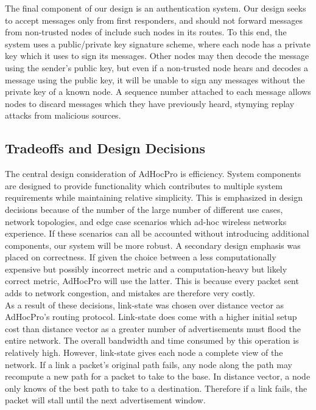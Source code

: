 \documentclass[letterpaper]{article}
\begin{document}
\noindent The final component of our design is an authentication system. Our design seeks to accept messages
only from first responders, and should not forward messages from non-trusted nodes of include such nodes in
its routes. To this end, the system uses a public/private key signature scheme, where each node has a private
key which it uses to sign its messages. Other nodes may then decode the message using the sender's
public key, but even if a non-trusted node hears and decodes a message using the public key, it will be 
unable to sign any messages without the private key of a known node. A sequence number attached to each
message allows nodes to discard messages which they have previously heard, stymying replay attacks from
malicious sources.

\subsection{Tradeoffs and Design Decisions}

The central design consideration of AdHocPro is efficiency. System components are designed to provide
functionality which contributes to multiple system requirements while maintaining relative simplicity.
This is emphasized in design decisions because of the number of the large number of different use cases,
network topologies, and edge case scenarios which ad-hoc wireless networks experience. If these scenarios
can all be accounted without introducing additional components, our system will be more robust. A 
secondary design emphasis was placed on correctness. If given the choice between a less computationally
expensive but possibly incorrect metric and a computation-heavy but likely correct metric, AdHocPro will
use the latter. This is because every packet sent adds to network congestion, and mistakes are therefore
very costly.
\\

\noindent As a result of these decisions, link-state was chosen over distance vector as AdHocPro's routing
protocol. Link-state does come with a higher initial setup cost than distance vector as a greater number of
advertisements must flood the entire network. The overall bandwidth and time consumed by this operation
is relatively high. However, link-state gives each node a complete view of the network. If a link a packet's
original path fails, any node along the path may recompute a new path for a packet to take to the base. In
distance vector, a node only knows of the best path to take to a destination. Therefore if a link fails, the
packet will stall until the next advertisement window.
\\
\end{document}
